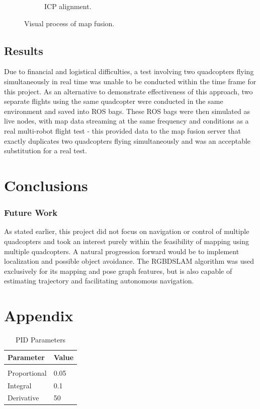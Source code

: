 \documentclass[letterpaper, oneside, 10pt]{report}
\begin{document}
\begin{figure}[h]
\begin{subfigure}[h]{0.31\textwidth}
        \caption{ICP alignment.}
        \label{fig:ICP alignment.}
    \end{subfigure}
    \caption{Visual process of map fusion.}
    \label{fig:Visual process of map fusion.}
\end{figure}

\section{Results}

Due to financial and logistical difficulties, a test involving two quadcopters flying simultaneously in real time was unable to be conducted within the time frame for this project. As an alternative to demonstrate effectiveness of this approach, two separate flights using the same quadcopter were conducted in the same environment and saved into ROS bags. These ROS bags were then simulated as live nodes, with map data streaming at the same frequency and conditions as a real multi-robot flight test - this provided data to the map fusion server that exactly duplicates two quadcopters flying simultaneously and was an acceptable substitution for a real test.

\chapter{Conclusions}

\subsection{Future Work}

As stated earlier, this project did not focus on navigation or control of multiple quadcopters and took an interest purely within the feasibility of mapping using multiple quadcopters. A natural progression forward would be to implement localization and possible object avoidance. The RGBDSLAM algorithm was used exclusively for its mapping and pose graph features, but is also capable of estimating trajectory and facilitating autonomous navigation.

\chapter{Appendix}

\begin{table}[h!]
  \centering
  \caption{PID Parameters}
  \vspace{2mm}
  \begin{tabular}{l l}
    \hline \hline
    \vspace{-2mm}
    Parameter & \multicolumn{1}{l}{Value} \\ [1ex]
    \hline
    & \\
    Proportional & 0.05 \\
    Integral & 0.1 \\
    Derivative & 50 \\
  \end{tabular}
\end{table}
\end{document}
